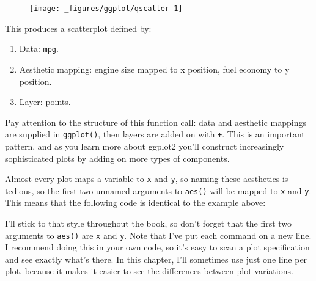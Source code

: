 \begin{Shaded}
\begin{Highlighting}[]
\NormalTok{(}  \StringTok{ }
\StringTok{  }\NormalTok{()}
\end{Highlighting}
\end{Shaded}

\begin{figure}[H]
  \centering
  \texttt{[image: \_figures/ggplot/qscatter-1]}
\end{figure}

This produces a scatterplot defined by:

\begin{enumerate}
\def\labelenumi{\arabic{enumi}.}
\tightlist
\item
  Data: \texttt{mpg}.
\item
  Aesthetic mapping: engine size mapped to x position, fuel economy to y
  position.
\item
  Layer: points.
\end{enumerate}

Pay attention to the structure of this function call: data and aesthetic
mappings are supplied in \texttt{ggplot()}, then layers are added on
with \texttt{+}. This is an important pattern, and as you learn more
about ggplot2 you'll construct increasingly sophisticated plots by
adding on more types of components.

Almost every plot maps a variable to \texttt{x} and \texttt{y}, so
naming these aesthetics is tedious, so the first two unnamed arguments
to \texttt{aes()} will be mapped to \texttt{x} and \texttt{y}. This
means that the following code is identical to the example above:

\begin{Shaded}
\begin{Highlighting}[]
\StringTok{  }\NormalTok{()}
\end{Highlighting}
\end{Shaded}

I'll stick to that style throughout the book, so don't forget that the
first two arguments to \texttt{aes()} are \texttt{x} and \texttt{y}.
Note that I've put each command on a new line. I recommend doing this in
your own code, so it's easy to scan a plot specification and see exactly
what's there. In this chapter, I'll sometimes use just one line per
plot, because it makes it easier to see the differences between plot
variations.

